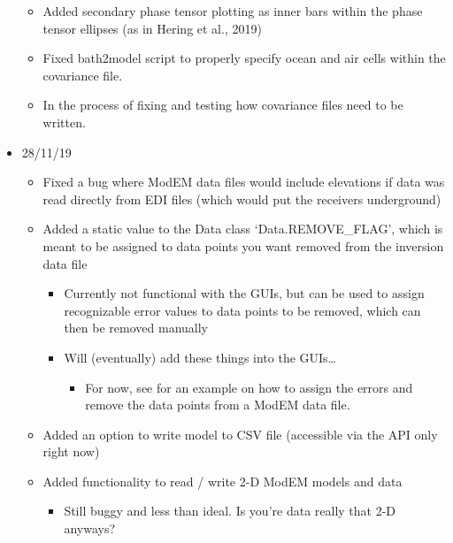 \documentclass[letterpaper,10pt,english]{sphinxmanual}
\begin{document}
\begin{itemize}
\begin{itemize}
\item {} 
Added secondary phase tensor plotting as inner bars within the phase tensor ellipses (as in Hering et al., 2019)

\item {} 
Fixed bath2model script to properly specify ocean and air cells within the covariance file.

\item {} 
In the process of fixing and testing how covariance files need to be written.

\end{itemize}

\item {} 
28/11/19
\begin{itemize}
\item {} 
Fixed a bug where ModEM data files would include elevations if data was read directly from EDI files (which would put the receivers underground)

\item {} 
Added a static value to the Data class ‘Data.REMOVE\_FLAG’, which is meant to be assigned to data points you want removed from the inversion data file
\begin{itemize}
\item {} 
Currently not functional with the GUIs, but can be used to assign recognizable error values to data points to be removed, which can then be removed manually

\item {} 
Will (eventually) add these things into the GUIs…
\begin{itemize}
\item {} 
For now, see {\hyperref[\detokenize{content/examples/recipes:recipes}]{}} for an example on how to assign the errors and remove the data points from a ModEM data file.

\end{itemize}

\end{itemize}

\item {} 
Added an option to write model to CSV file (accessible via the API only right now)

\item {} 
Added functionality to read / write 2-D ModEM models and data
\begin{itemize}
\item {} 
Still buggy and less than ideal. Is you’re data really that 2-D anyways?


\end{itemize}
\end{itemize}
\end{itemize}
\end{document}
